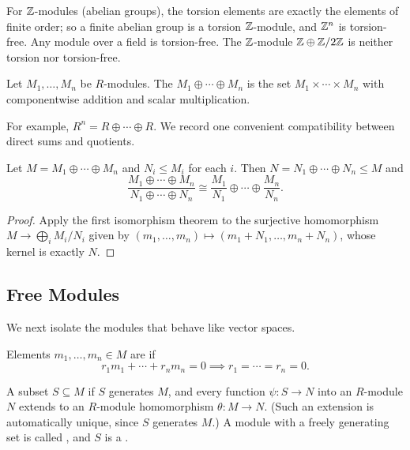 \documentclass[a4paper]{scrartcl}
\begin{document}
\begin{example}
	For $\mathbb{Z}$-modules (abelian groups), the torsion elements are exactly the elements of finite order; so a finite abelian group is a torsion $\mathbb{Z}$-module, and $\mathbb{Z}^n$ is torsion-free. Any module over a field is torsion-free. The $\mathbb{Z}$-module $\mathbb{Z} \oplus \mathbb{Z}/2\mathbb{Z}$ is neither torsion nor torsion-free.
\end{example}

\begin{definition}
	Let $M_1, \dots, M_n$ be $R$-modules. The  $M_1 \oplus \cdots \oplus M_n$ is the set $M_1 \times \cdots \times M_n$ with componentwise addition and scalar multiplication.
\end{definition}

For example, $R^n = R \oplus \cdots \oplus R$. We record one convenient compatibility between direct sums and quotients.

\begin{lemma}
	Let $M = M_1 \oplus \cdots \oplus M_n$ and $N_i \leq M_i$ for each $i$. Then $N = N_1 \oplus \cdots \oplus N_n \leq M$ and
	$$
	\frac{M_1 \oplus \cdots \oplus M_n}{N_1 \oplus \cdots \oplus N_n} \cong \frac{M_1}{N_1} \oplus \cdots \oplus \frac{M_n}{N_n}.
	$$
\end{lemma}
\begin{proof}
	Apply the first isomorphism theorem to the surjective homomorphism $M \rightarrow \bigoplus_i M_i/N_i$ given by $(m_1, \dots, m_n) \mapsto (m_1 + N_1, \dots, m_n + N_n)$, whose kernel is exactly $N$.
\end{proof}

\subsection{Free Modules}

We next isolate the modules that behave like vector spaces.

\begin{definition}[Independence]
	Elements $m_1, \dots, m_n \in M$ are  if
	$$
	r_1 m_1 + \cdots + r_n m_n = 0 \implies r_1 = \cdots = r_n = 0.
	$$
\end{definition}

\begin{definition}
	A subset $S \subseteq M$  if $S$ generates $M$, and every function $\psi: S \rightarrow N$ into an $R$-module $N$ extends to an $R$-module homomorphism $\theta: M \rightarrow N$. (Such an extension is automatically unique, since $S$ generates $M$.) A module with a freely generating set is called , and $S$ is a .
\end{definition}
\end{document}
